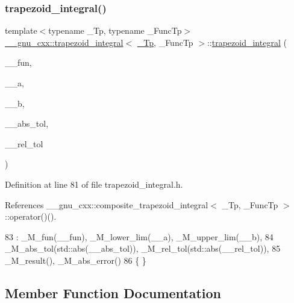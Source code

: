 \subsubsection{\texorpdfstring{trapezoid\+\_\+integral()}{trapezoid\_integral()}}
{\footnotesize\ttfamily template$<$typename \+\_\+\+Tp, typename \+\_\+\+Func\+Tp$>$ \\
\hyperlink{class____gnu__cxx_1_1trapezoid__integral}{\+\_\+\+\_\+gnu\+\_\+cxx\+::trapezoid\+\_\+integral}$<$ \hyperlink{namespace____gnu__cxx_a3b19a9c800ca194374ef9172290f7d79}{\+\_\+\+Tp}, \+\_\+\+Func\+Tp $>$\+::\hyperlink{class____gnu__cxx_1_1trapezoid__integral}{trapezoid\+\_\+integral} (\begin{DoxyParamCaption}\item[{\+\_\+\+Func\+Tp}]{\+\_\+\+\_\+fun,  }\item[{\hyperlink{namespace____gnu__cxx_a3b19a9c800ca194374ef9172290f7d79}{\+\_\+\+Tp}}]{\+\_\+\+\_\+a,  }\item[{\hyperlink{namespace____gnu__cxx_a3b19a9c800ca194374ef9172290f7d79}{\+\_\+\+Tp}}]{\+\_\+\+\_\+b,  }\item[{\hyperlink{namespace____gnu__cxx_a3b19a9c800ca194374ef9172290f7d79}{\+\_\+\+Tp}}]{\+\_\+\+\_\+abs\+\_\+tol,  }\item[{\hyperlink{namespace____gnu__cxx_a3b19a9c800ca194374ef9172290f7d79}{\+\_\+\+Tp}}]{\+\_\+\+\_\+rel\+\_\+tol }\end{DoxyParamCaption})\hspace{0.3cm}{\ttfamily [inline]}}



Definition at line 81 of file trapezoid\+\_\+integral.\+h.



References \+\_\+\+\_\+gnu\+\_\+cxx\+::composite\+\_\+trapezoid\+\_\+integral$<$ \+\_\+\+Tp, \+\_\+\+Func\+Tp $>$\+::operator()().


\begin{DoxyCode}
83       : \_M\_fun(\_\_fun), \_M\_lower\_lim(\_\_a), \_M\_upper\_lim(\_\_b),
84         \_M\_abs\_tol(std::abs(\_\_abs\_tol)), \_M\_rel\_tol(std::abs(\_\_rel\_tol)),
85         \_M\_result(), \_M\_abs\_error()
86       \{ \}
\end{DoxyCode}


\subsection{Member Function Documentation}
\mbox{\label{class____gnu__cxx_1_1trapezoid__integral_ae5598587469757611020ea346ae8bf4f}} 
